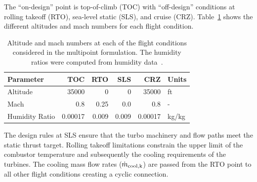 \documentclass[conf]{new-aiaa}
\begin{document}
The ``on-design'' point is top-of-climb (TOC) with ``off-design'' conditions at rolling takeoff (RTO), sea-level static (SLS), and cruise (CRZ).
Table~\ref{tab:flight_conds} shows the different altitudes and mach numbers for each flight condition.
\begin{table}[hbt!]
  \centering
  \caption{Altitude and mach numbers at each of the flight conditions considered in the multipoint formulation.
    The humidity ratios were computed from humidity data~\cite{Kalnay1996}.
  }
  \begin{tabular}{l r r r r l}
    \hline
    Parameter      & TOC     & RTO   & SLS   & CRZ     & Units      \\
    \hline
    Altitude       & 35000   & 0     & 0     & 35000   & \si{ft}    \\
    Mach           & 0.8     & 0.25  & 0.0   & 0.8     & -          \\
    Humidity Ratio & 0.00017 & 0.009 & 0.009 & 0.00017 & \si{kg/kg} \\
    \hline
  \end{tabular}
  \label{tab:flight_conds}
\end{table}
The design rules at SLS ensure that the turbo machinery and flow paths meet the static thrust target.
Rolling takeoff limitations constrain the upper limit of the combustor temperature and subsequently the cooling requirements of the turbines.
The cooling mass flow rates ($\dot{m}_{\rm{cool},k}$) are passed from the RTO point to all other flight conditions creating a cyclic connection.
\end{document}
